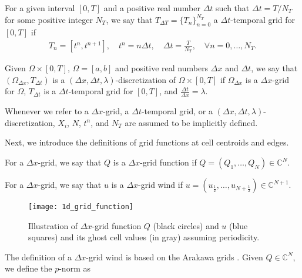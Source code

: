 \begin{definition}
	For a given interval $[0,T]$ and a positive real number $\Delta t$ such that $\Delta t = T/N_T$
    for some positive integer $N_T$, we say that  $T_{\Delta T}= \{T_n\}_{n=0}^{N_T}$ a $\Delta t$-temporal grid for $[0,T]$ if
    \begin{align*}
	T_n = [t^n, t^{n+1}], \quad t^n = n\Delta t, \quad \Delta t = \frac{T}{N_T}, \quad \forall n = 0, \ldots, N_T.
    \end{align*}
\end{definition}
\begin{definition}
\label{chp2-def-dxtimegrid}
	Given $\Omega \times [0,T]$, $\Omega = [a,b]$ and positive real numbers $\Delta x$ and $\Delta t$,
    we say that $(\Omega_{\Delta x}, T_{\Delta t})$ is a $(\Delta x, \Delta t, \lambda)$-discretization 
    of $\Omega \times [0,T]$ if $\Omega_{\Delta x}$ is a $\Delta x$-grid for $\Omega$, 
    ${T}_{\Delta t}$ is a $\Delta t$-temporal grid for $[0,T]$, and $\frac{\Delta t}{\Delta x} = \lambda$.
\end{definition}
\begin{remark}
	Whenever we refer to a $\Delta x$-grid, a $\Delta t$-temporal grid, or a $(\Delta x, \Delta t, \lambda)$-discretization, 
	$X_i$, $N$, $t^n$, and $N_T$ are assumed to be implicitly defined.
\end{remark}
Next, we introduce the definitions of grid functions at cell centroids and edges.
\begin{definition}
	For a $\Delta x$-grid, we say that $Q$ is a $\Delta x$-grid function if $Q = (Q_1, \ldots, Q_N) \in \mathbb{C}^N$.
\end{definition}
\begin{definition}
	For a $\Delta x$-grid, we say that $u$ is a $\Delta x$-grid wind if
	$u = (u_{\frac{1}{2}}, \ldots, u_{N+\frac{1}{2}}) \in \mathbb{C}^{N+1}$.
\end{definition}
\begin{figure}[!htb]
	\centering
	\texttt{[image: 1d\_grid\_function]}
	\caption{Illustration of $\Delta x$-grid function $Q$ (black circles) 
		and $u$ (blue squares) and its ghost cell
		values (in gray) assuming periodicity.\label{chp2-sec1-grid1d-function}}
\end{figure}
The definition of a $\Delta x$-grid wind is based on the Arakawa grids \citep{arakawa:1977}.
Given $Q \in \mathbb{C}^{N}$, we define the $p$-norm as
